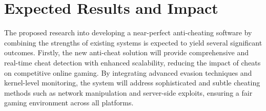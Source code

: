 \documentclass[a4paper, 12pt]{article}
\begin{document}
\begin{table}[H]
    \centering
    \caption{Gantt Chart of Research Schedule}
    \label{tab:research_schedule}
\end{table}

\section{Expected Results and Impact}
The proposed research into developing a near-perfect anti-cheating software by combining the strengths of existing systems is expected to yield several significant outcomes. Firstly, the new anti-cheat solution will provide comprehensive and real-time cheat detection with enhanced scalability, reducing the impact of cheats on competitive online gaming. By integrating advanced evasion techniques and kernel-level monitoring, the system will address sophisticated and subtle cheating methods such as network manipulation and server-side exploits, ensuring a fair gaming environment across all platforms.
\end{document}
